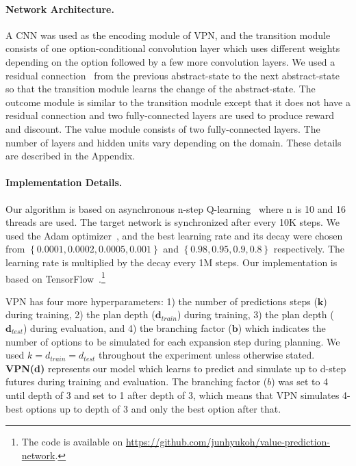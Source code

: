 \documentclass{article}
\newcommand{\supplementary}{Appendix}
\newcommand{\cutparagraphup}{\vspace{-2pt}}
\begin{document}
\paragraph{Network Architecture.} 
A CNN was used as the encoding module of VPN, and the transition module consists of one option-conditional convolution layer which uses different weights depending on the option followed by a few more convolution layers. We used a residual connection~\citep{He2016DeepRL} from the previous abstract-state to the next abstract-state so that the transition module learns the change of the abstract-state. The outcome module is similar to the transition module except that it does not have a residual connection and two fully-connected layers are used to produce reward and discount. The value module consists of two fully-connected layers. The number of layers and hidden units vary depending on the domain. These details are described in the \supplementary.

\cutparagraphup
\paragraph{Implementation Details.}
Our algorithm is based on asynchronous n-step Q-learning~\citep{mnih2016asynchronous} where n is 10 and 16 threads are used. The target network is synchronized after every 10K steps. We used the Adam optimizer~\citep{Kingma2014AdamAM}, and the best learning rate and its decay were chosen from $\left\{0.0001, 0.0002, 0.0005, 0.001 \right\}$ and $\left\{0.98, 0.95, 0.9, 0.8\right\}$ respectively. The learning rate is multiplied by the decay every 1M steps. Our implementation is based on TensorFlow~\citep{Abadi2015TensorFlowLM}.\footnote{The code is available on \url{https://github.com/junhyukoh/value-prediction-network}.}

VPN has four more hyperparameters: 1) the number of predictions steps ($\textbf{k}$) during training, 2) the plan depth ($\textbf{d}_{train}$) during training, 3) the plan depth ($\textbf{d}_{test}$) during evaluation, and 4) the branching factor ($\textbf{b}$) which indicates the number of options to be simulated for each expansion step during planning. We used $k=d_{train}=d_{test}$ throughout the experiment unless otherwise stated. \textbf{VPN(d)} represents our model which learns to predict and simulate up to d-step futures during training and evaluation. The branching factor ($b$) was set to 4 until depth of 3 and set to 1 after depth of 3, which means that VPN simulates 4-best options up to depth of 3 and only the best option after that. 
\end{document}
